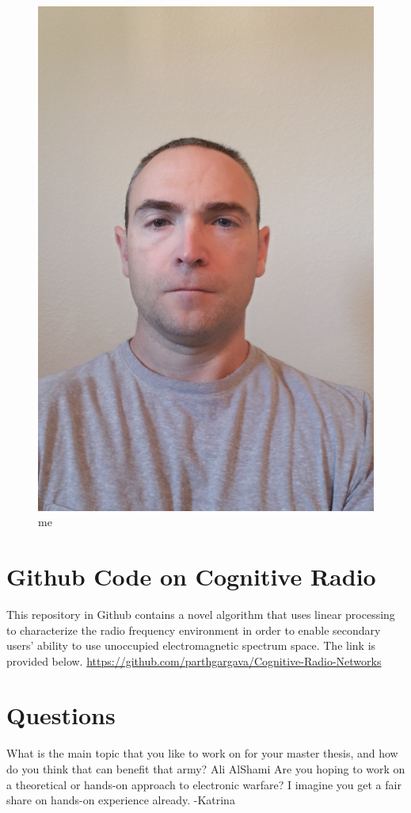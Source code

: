 \begin{figure}
    \centering
    \includegraphics[scale=.1]{self pic2.jpg}
    \caption{me}
    \label{fig:me}
\end{figure}
\section{Github Code on Cognitive Radio}
This repository in Github contains a novel algorithm that uses linear processing to characterize the radio frequency environment in order to enable secondary users' ability to use unoccupied electromagnetic spectrum space.  The link is provided below.
\url{https://github.com/parthgargava/Cognitive-Radio-Networks}

\section{Questions}
What is the main topic that you like to work on for your master thesis, and how do you think that can benefit that army? Ali AlShami
\newline
Are you hoping to work on a theoretical or hands-on approach to electronic warfare? I imagine you get a fair share on hands-on experience already. -Katrina

%
